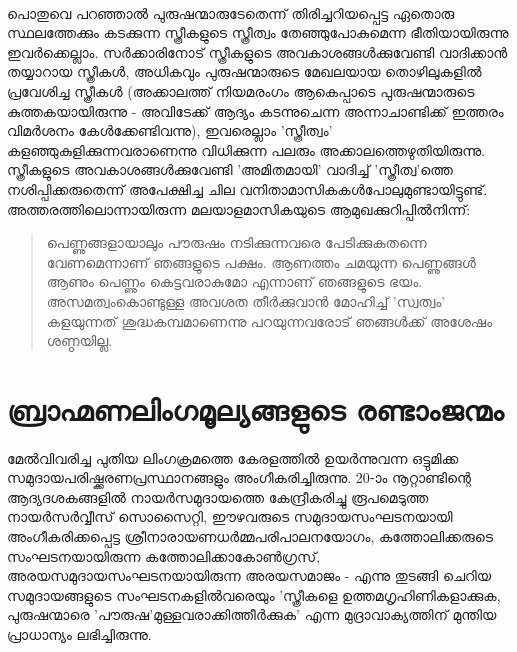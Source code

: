 \paragraph{}പൊതുവെ പറഞ്ഞാൽ പുരുഷന്മാരുടേതെന്ന് തിരിച്ചറിയപ്പെട്ട ഏതൊരു സ്ഥലത്തേക്കും കടക്കുന്ന സ്ത്രീകളുടെ സ്ത്രീത്വം തേഞ്ഞുപോകുമെന്ന ഭീതിയായിരുന്നു ഇവർക്കെല്ലാം. സർക്കാരിനോട് സ്ത്രീകളുടെ അവകാശങ്ങൾക്കുവേണ്ടി വാദിക്കാൻ തയ്യാറായ സ്ത്രീകൾ, അധികവും പുരുഷന്മാരുടെ മേഖലയായ തൊഴിലുകളിൽ പ്രവേശിച്ച സ്ത്രീകൾ (അക്കാലത്ത് നിയമരംഗം ആകെപ്പാടെ പുരുഷന്മാരുടെ കുത്തകയായിരുന്നു - അവിടേക്ക് ആദ്യം കടന്നുചെന്ന അന്നാചാണ്ടിക്ക് ഇത്തരം വിമർശനം കേൾക്കേണ്ടിവന്നു), ഇവരെല്ലാം 'സ്ത്രീത്വം' കളഞ്ഞുകുളിക്കുന്നവരാണെന്നു വിധിക്കുന്ന പലരും അക്കാലത്തെഴുതിയിരുന്നു. സ്ത്രീകളുടെ അവകാശങ്ങൾക്കുവേണ്ടി 'അമിതമായി' വാദിച്ച് 'സ്ത്രീത്വ'ത്തെ നശിപ്പിക്കരുതെന്ന് അപേക്ഷിച്ച ചില വനിതാമാസികകൾപോലുമുണ്ടായിട്ടുണ്ട്. അത്തരത്തിലൊന്നായിരുന്ന മലയാളമാസികയുടെ ആമുഖക്കുറിപ്പിൽനിന്ന്:

\begin{quotation}
\noindent
പെണ്ണുങ്ങളായാലും പൗരുഷം നടിക്കുന്നവരെ പേടിക്കുകതന്നെ വേണമെന്നാണ് ഞങ്ങളുടെ പക്ഷം. ആണത്തം ചമയുന്ന പെണ്ണുങ്ങൾ ആണും പെണ്ണും കെട്ടവരാകുമോ എന്നാണ് ഞങ്ങളുടെ ഭയം. അസമത്വംകൊണ്ടുള്ള അവശത തീർക്കുവാൻ മോഹിച്ച് 'സ്വത്വം' കളയുന്നത് ശുദ്ധകമ്പമാണെന്നു പറയുന്നവരോട് ഞങ്ങൾക്ക് അശേഷം ശണ്ഠയില്ല.
\end{quotation}

\section{ബ്രാഹ്മണലിംഗമൂല്യങ്ങളുടെ രണ്ടാംജന്മം}
\label{ch4sec3}
\paragraph{}മേൽവിവരിച്ച പുതിയ ലിംഗക്രമത്തെ കേരളത്തിൽ ഉയർന്നുവന്ന ഒട്ടുമിക്ക സമുദായപരിഷ്ക്കരണപ്രസ്ഥാനങ്ങളും അംഗീകരിച്ചിരുന്നു. 20-ാം നൂറ്റാണ്ടിന്റെ ആദ്യദശകങ്ങളിൽ നായർസമുദായത്തെ കേന്ദ്രീകരിച്ചു രൂപമെടുത്ത നായർസർവ്വീസ് സൊസൈറ്റി, ഈഴവരുടെ സമുദായസംഘടനയായി അംഗീകരിക്കപ്പെട്ട ശ്രീനാരായണധർമ്മപരിപാലനയോഗം, കത്തോലിക്കരുടെ സംഘടനയായിരുന്ന കത്തോലിക്കാകോൺഗ്രസ്, അരയസമുദായസംഘടനയായിരുന്ന അരയസമാജം - എന്നു തുടങ്ങി ചെറിയ സമുദായങ്ങളുടെ സംഘടനകളിൽവരെയും 'സ്ത്രീകളെ ഉത്തമഗൃഹിണികളാക്കുക, പുരുഷന്മാരെ 'പൗരുഷ'മുള്ളവരാക്കിത്തീർക്കുക' എന്ന മുദ്രാവാക്യത്തിന് മുന്തിയ പ്രാധാന്യം ലഭിച്ചിരുന്നു.

